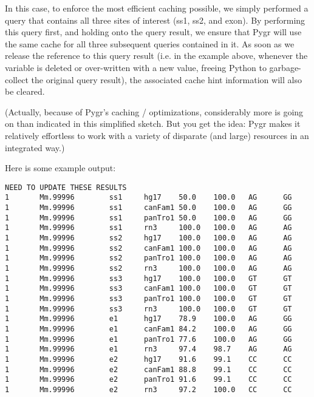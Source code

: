 \documentclass{howto}
\begin{document}
\begin{itemize}
In this case, to enforce the most efficient caching possible, we simply performed
a query that contains all three sites of interest (ss1, ss2, and exon).  By performing
this query first, and holding onto the query result, we ensure that Pygr will
use the same cache for all three subsequent queries contained in it.  As soon
as we release the reference to this query result (i.e. in the example above,
whenever the variable  is deleted or over-written with a new value,
freeing Python to garbage-collect the original query result), the associated 
cache hint information will also be cleared.

\end{itemize}

(Actually, because of Pygr's caching / optimizations, considerably more is going on than indicated in this simplified sketch.  But you get the idea: Pygr makes it relatively effortless to work with a variety of disparate (and large) resources in an integrated way.)

Here is some example output:
\begin{verbatim}
NEED TO UPDATE THESE RESULTS
1       Mm.99996        ss1     hg17    50.0    100.0   AG      GG
1       Mm.99996        ss1     canFam1 50.0    100.0   AG      GG
1       Mm.99996        ss1     panTro1 50.0    100.0   AG      GG
1       Mm.99996        ss1     rn3     100.0   100.0   AG      AG
1       Mm.99996        ss2     hg17    100.0   100.0   AG      AG
1       Mm.99996        ss2     canFam1 100.0   100.0   AG      AG
1       Mm.99996        ss2     panTro1 100.0   100.0   AG      AG
1       Mm.99996        ss2     rn3     100.0   100.0   AG      AG
1       Mm.99996        ss3     hg17    100.0   100.0   GT      GT
1       Mm.99996        ss3     canFam1 100.0   100.0   GT      GT
1       Mm.99996        ss3     panTro1 100.0   100.0   GT      GT
1       Mm.99996        ss3     rn3     100.0   100.0   GT      GT
1       Mm.99996        e1      hg17    78.9    100.0   AG      GG
1       Mm.99996        e1      canFam1 84.2    100.0   AG      GG
1       Mm.99996        e1      panTro1 77.6    100.0   AG      GG
1       Mm.99996        e1      rn3     97.4    98.7    AG      AG
1       Mm.99996        e2      hg17    91.6    99.1    CC      CC
1       Mm.99996        e2      canFam1 88.8    99.1    CC      CC
1       Mm.99996        e2      panTro1 91.6    99.1    CC      CC
1       Mm.99996        e2      rn3     97.2    100.0   CC      CC
\end{verbatim}
\end{document}

